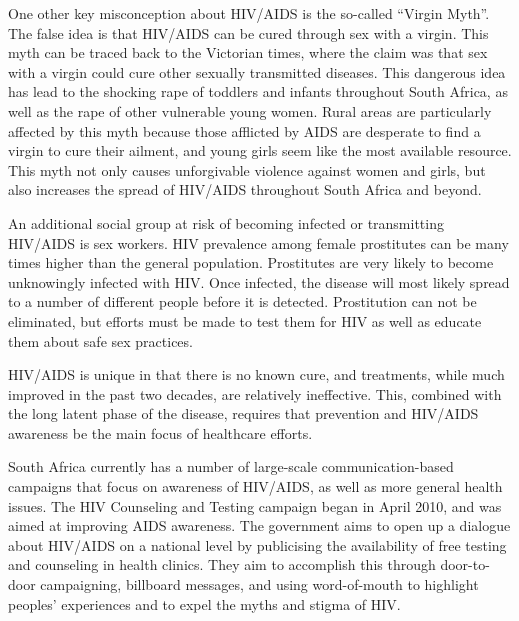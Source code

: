 \documentclass[12pt]{report}
\begin{document}
One other key misconception about HIV/AIDS is the so-called ``Virgin Myth''.
The false idea is that HIV/AIDS can be cured through sex with a virgin.
This myth can be traced back to the Victorian times, where the claim was that sex with a virgin could cure other sexually transmitted diseases.
This dangerous idea has lead to the shocking rape of toddlers and infants throughout South Africa, as well as the rape of other vulnerable young women\cite{rape}.
Rural areas are particularly affected by this myth because those afflicted by AIDS are desperate to find a virgin to cure their ailment, and young girls seem like the most available resource.
This myth not only causes unforgivable violence against women and girls, but also increases the spread of HIV/AIDS throughout South Africa and beyond.

An additional social group at risk of becoming infected or transmitting HIV/AIDS is sex workers.
HIV prevalence among female prostitutes can be many times higher than the general population.  
Prostitutes are very likely to become unknowingly infected with HIV\cite{avert}.
Once infected, the disease will most likely spread to a number of different people before it is detected.
Prostitution can not be eliminated, but efforts must be made to test them for HIV as well as educate them about safe sex practices.


HIV/AIDS is unique in that there is no known cure, and treatments, while much improved in the past two decades, are relatively ineffective.  
This, combined with the long latent phase of the disease, requires that prevention and HIV/AIDS awareness be the main focus of healthcare efforts.

South Africa currently has a number of large-scale communication-based campaigns that focus on awareness of HIV/AIDS, as well as more general health issues.
The HIV Counseling and Testing campaign began in April 2010, and was aimed at improving AIDS awareness.
The government aims to open up a dialogue about HIV/AIDS on a national level by publicising the availability of free testing and counseling in health clinics.
They aim to accomplish this through door-to-door campaigning, billboard messages, and using word-of-mouth to highlight peoples' experiences and to expel the myths and stigma of HIV.
\end{document}

